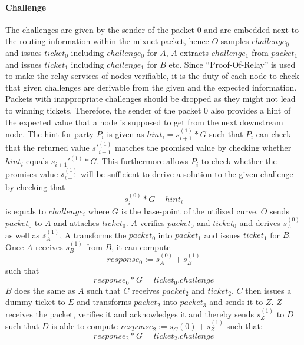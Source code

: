\paragraph{Challenge}
The challenges are given by the sender of the packet $0$ and are embedded next to the routing information within the mixnet packet, hence $O$ samples $challenge_0$ and issues $ticket_0$ including $challenge_0$ for $A$, $A$ extracts $challenge_1$ from $packet_1$ and issues $ticket_1$ including $challenge_1$ for $B$ etc.
\newline Since “Proof-Of-Relay” is used to make the relay services of nodes verifiable, it is the duty of each node to check that given challenges are derivable from the given and the expected information. 
Packets with inappropriate challenges should be dropped as they might not lead to winning tickets.
\newline Therefore, the sender of the packet $0$ also provides a hint of the expected value that a node is supposed to get from the next downstream node. 
The hint for party $P_i$ is given as $hint_i=s_{i+1}^{(1)}*G$ such that $P_i$ can check that the returned value $s'^{(1)}_{i+1}$ matches the promised value by checking whether $hint_i$ equals $s_{i+1}'^{(1)}*G$. 
This furthermore allows $P_i$ to check whether the promises value $s_{i+1}^{(1)}$ will be sufficient to derive a solution to the given challenge by checking that $$s_i^{(0)}*G+hint_i$$ is equals to $challenge_i$ where $G$ is the base-point of the utilized curve.
\newline $O$ sends $packet_0$ to $A$ and attaches $ticket_0$. $A$ verifies $packet_0$ and $ticket_0$ and derives $s_A^{(0)}$ as well as $s_A^{(1)}$, A transforms the $packet_0$ into $packet_1$ and issues $ticket_1$ for $B$. 
Once $A$ receives $s_B^{(1)}$ from $B$, it can compute $$response_0:=s_A^{(0)}+s_B^{(1)}$$ such that $$response_0*G=ticket_0.challenge$$ $B$ does the same as $A$ such that $C$ receives $packet_2$ and $ticket_2$. 
$C$ then issues a dummy ticket to $E$ and transforms $packet_2$ into $packet_3$ and sends it to $Z$. 
$Z$ receives the packet, verifies it and acknowledges it and thereby sends $s_Z^{(1)}$ to $D$ such that $D$ is able to compute 
$response_2:=s_C{(0)}+s_Z^{(1)}$ such that: $$response_2*G=ticket_2.challenge$$



